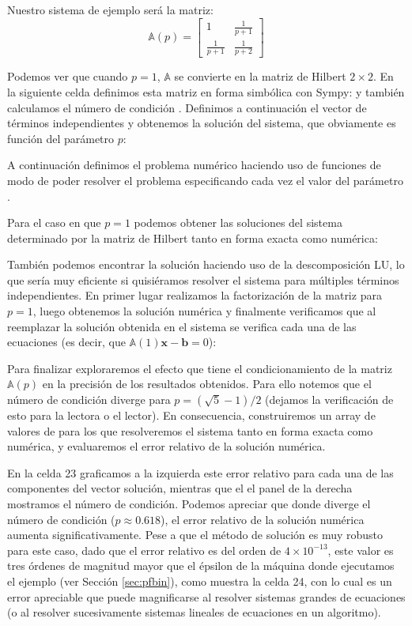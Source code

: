 Nuestro sistema de ejemplo será la matriz:
\[ 
\mathbb{A}(p) = 
\begin{bmatrix}
 1 & \frac{1}{p+1} \\
 \frac{1}{p+1} & \frac{1}{p+2}
\end{bmatrix}
\]

Podemos ver que cuando $p = 1$, $\mathbb{A}$ se convierte en la matriz de Hilbert $2 \times 2$. En la siguiente celda definimos esta matriz en forma simbólica con Sympy:
y también calculamos el número de condición . Definimos a continuación el vector de términos independientes y obtenemos la solución del sistema, que obviamente es función del parámetro $p$:

A continuación definimos el problema numérico haciendo uso de funciones  de modo de poder resolver el problema especificando cada vez el valor del parámetro .

Para el caso en que $p=1$ podemos obtener las soluciones del sistema determinado por la matriz de Hilbert tanto en forma exacta como numérica:

También podemos encontrar la solución haciendo uso de la descomposición LU, lo que sería muy eficiente si quisiéramos resolver el sistema para múltiples términos independientes. En primer lugar realizamos la factorización de la matriz  para $p = 1$, luego obtenemos la solución numérica  y finalmente verificamos que al reemplazar la solución obtenida en el sistema se verifica cada una de las ecuaciones (es decir, que $\mathbb{A}(1) \bm{x} - \bm{b} = 0$):

Para finalizar exploraremos el efecto que tiene el condicionamiento de la matriz $\mathbb{A}(p)$ en la precisión de los resultados obtenidos. Para ello notemos que el número de condición diverge para $p = (\sqrt{5} - 1)/2$ (dejamos la verificación de esto para la lectora o el lector). En consecuencia, construiremos un array de valores de  para los que resolveremos el sistema tanto en forma exacta como numérica, y evaluaremos el error relativo de la solución numérica. 

En la celda 23 graficamos a la izquierda este error relativo para cada una de las componentes del vector solución, mientras que el el panel de la derecha mostramos el número de condición. Podemos apreciar que donde diverge el número de condición ($p \approx 0.618$), el error relativo de la solución numérica aumenta significativamente. Pese a que el método de solución es muy robusto para este caso, dado que el error relativo es del orden de $4 \times 10^{-13}$, este valor es tres órdenes de magnitud mayor que el épsilon de la máquina donde ejecutamos el ejemplo (ver Sección \ref{sec:pfbin}), como muestra la celda 24, con lo cual es un error apreciable que puede magnificarse al resolver sistemas grandes de ecuaciones (o al resolver sucesivamente sistemas lineales de ecuaciones en un algoritmo).

